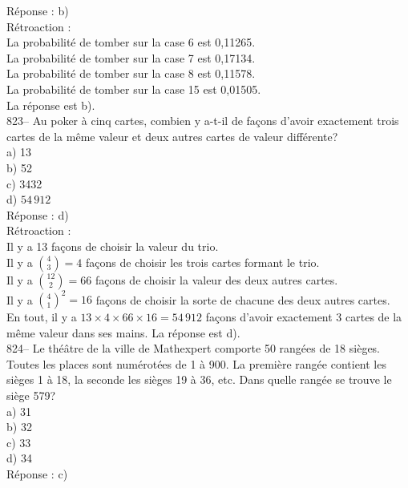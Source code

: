 ﻿\documentclass[letterpaper, 12pt]{article}
\begin{document}
R\'eponse : b)\\

R\'etroaction : \\
La probabilit\'e de tomber sur la case 6 est 0,11265.\\
La probabilit\'e de tomber sur la case 7 est 0,17134.\\
La probabilit\'e de tomber sur la case 8 est 0,11578.\\
La probabilit\'e de tomber sur la case 15 est 0,01505.\\
La r\'eponse est b).\\

823-- Au poker \`a cinq cartes, combien y a-t-il de fa\c cons d'avoir
exactement trois cartes de la m\^eme valeur et deux autres cartes de valeur
diff\'erente?\\
a) 13\\
b) 52\\
c) 3432\\
d) $54\,912$\\

R\'eponse : d)\\

R\'etroaction : \\
Il y a 13 fa\c cons de choisir la valeur du trio.\\ [2mm] Il y a
$\binom{4}{3}=4$ fa\c cons de choisir les trois cartes formant le
trio.\\ [2mm] Il y a $\binom{12}{2}=66$ fa\c cons de choisir la
valeur des deux autres cartes.\\ [2mm] Il y a $\binom{4}{1}^{2}=16$
fa\c cons de choisir la sorte de chacune des deux autres cartes.\\
[2mm]
En tout, il y a $13\times4\times66\times16=54\,912$ fa\c cons d'avoir
exactement 3 cartes de la m\^eme valeur dans ses mains.  La r\'eponse est
d).\\

824-- Le th\'e\^atre de la ville de Mathexpert comporte 50 rang\'ees de 18
si\`eges.  Toutes  les places sont num\'erot\'ees de 1 \`a 900.  La
premi\`ere rang\'ee contient les si\`eges 1 \`a 18, la seconde les si\`eges
19 \`a 36, etc.  Dans quelle rang\'ee se trouve le si\`ege 579?\\
a) 31\\
b) 32\\
c) 33\\
d) 34\\

R\'eponse : c) \\
\end{document}

